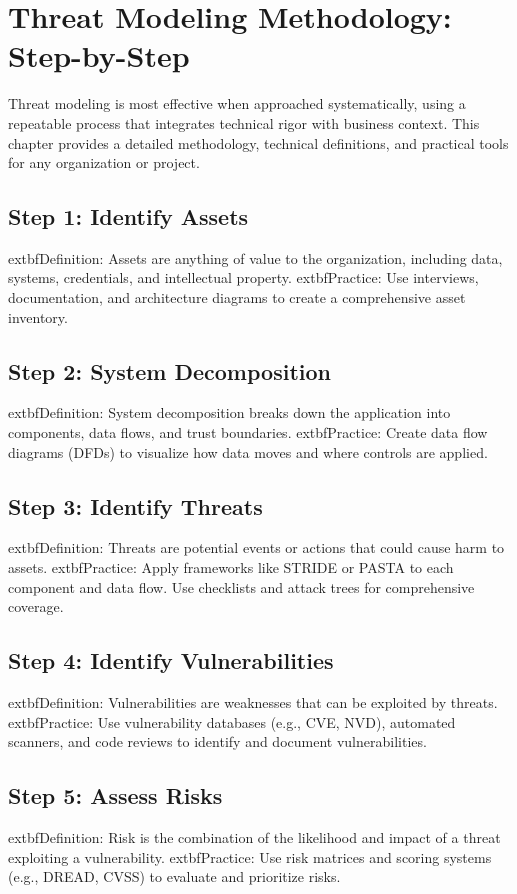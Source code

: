 
\section*{Threat Modeling Methodology: Step-by-Step}
Threat modeling is most effective when approached systematically, using a repeatable process that integrates technical rigor with business context\cite{shostack2014,uceda2015,owasp}. This chapter provides a detailed methodology, technical definitions, and practical tools for any organization or project.

\subsection*{Step 1: Identify Assets}
	extbf{Definition:} Assets are anything of value to the organization, including data, systems, credentials, and intellectual property.\cite{nist800154}
	extbf{Practice:} Use interviews, documentation, and architecture diagrams to create a comprehensive asset inventory.

\subsection*{Step 2: System Decomposition}
	extbf{Definition:} System decomposition breaks down the application into components, data flows, and trust boundaries.\cite{shostack2014}
	extbf{Practice:} Create data flow diagrams (DFDs) to visualize how data moves and where controls are applied.

\subsection*{Step 3: Identify Threats}
	extbf{Definition:} Threats are potential events or actions that could cause harm to assets.\cite{owasp}
	extbf{Practice:} Apply frameworks like STRIDE or PASTA to each component and data flow. Use checklists and attack trees for comprehensive coverage.

\subsection*{Step 4: Identify Vulnerabilities}
	extbf{Definition:} Vulnerabilities are weaknesses that can be exploited by threats.\cite{nist800154}
	extbf{Practice:} Use vulnerability databases (e.g., CVE, NVD), automated scanners, and code reviews to identify and document vulnerabilities.

\subsection*{Step 5: Assess Risks}
	extbf{Definition:} Risk is the combination of the likelihood and impact of a threat exploiting a vulnerability.\cite{uceda2015}
	extbf{Practice:} Use risk matrices and scoring systems (e.g., DREAD, CVSS) to evaluate and prioritize risks.

